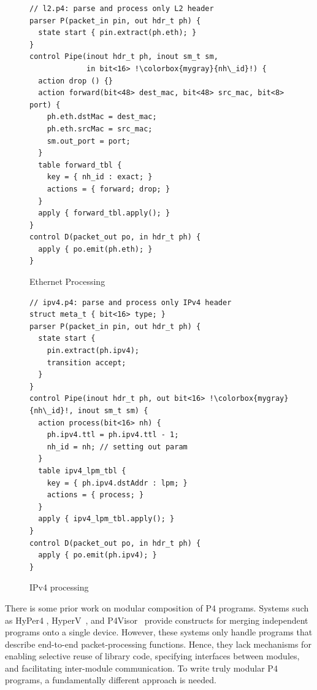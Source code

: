 \documentclass[letterpaper,twocolumn,10pt]{article}
\begin{document}
\begin{figure}[ht]
\begin{lstlisting}[frame=none, escapechar=!]
// l2.p4: parse and process only L2 header
parser P(packet_in pin, out hdr_t ph) {
  state start { pin.extract(ph.eth); }
}
control Pipe(inout hdr_t ph, inout sm_t sm,
             in bit<16> !\colorbox{mygray}{nh\_id}!) {
  action drop () {}
  action forward(bit<48> dest_mac, bit<48> src_mac, bit<8> port) {
    ph.eth.dstMac = dest_mac;
    ph.eth.srcMac = src_mac;
    sm.out_port = port;
  }
  table forward_tbl {
    key = { nh_id : exact; }
    actions = { forward; drop; }
  }
  apply { forward_tbl.apply(); }
}
control D(packet_out po, in hdr_t ph) {
  apply { po.emit(ph.eth); }
}
\end{lstlisting}
\caption{Ethernet Processing}
\label{fig:l2.p4}
\end{figure}

\begin{figure}[ht]
\begin{lstlisting}[frame=none, escapechar=!]
// ipv4.p4: parse and process only IPv4 header
struct meta_t { bit<16> type; }
parser P(packet_in pin, out hdr_t ph) {
  state start {
    pin.extract(ph.ipv4);
    transition accept;
  }
}
control Pipe(inout hdr_t ph, out bit<16> !\colorbox{mygray}{nh\_id}!, inout sm_t sm) {
  action process(bit<16> nh) {
    ph.ipv4.ttl = ph.ipv4.ttl - 1;
    nh_id = nh; // setting out param
  }
  table ipv4_lpm_tbl {
    key = { ph.ipv4.dstAddr : lpm; }
    actions = { process; }
  }
  apply { ipv4_lpm_tbl.apply(); }
}
control D(packet_out po, in hdr_t ph) {
  apply { po.emit(ph.ipv4); }
}
\end{lstlisting}
\caption{IPv4 processing}
\label{fig:ipv4.p4}
\end{figure}


There is some prior work on modular composition of P4 programs.
Systems such as HyPer4 \cite{Hancock:2016:HUP:2999572.2999607},
HyperV~\cite{8038396}, and
P4Visor~\cite{Zheng:2018:PLV:3281411.3281436} provide constructs for
merging independent programs onto a single device. However, these
systems only handle programs that describe end-to-end
packet-processing functions. Hence, they lack mechanisms for enabling
selective reuse of library code, specifying interfaces between
modules, and facilitating inter-module communication. To write truly
modular P4 programs, a fundamentally different approach is needed.
\end{document}
